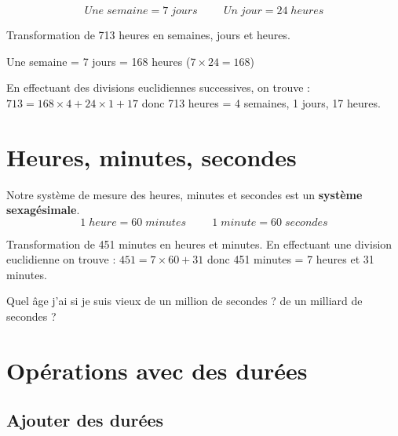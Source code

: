 \begin{pageCours}
\begin{Def}
\[Une \;semaine = 7 \;jours \hspace{1cm} Un\; jour = 24 \;heures\]
\end{Def}

\begin{Mt}
Transformation de 713 heures en semaines, jours et heures.

Une semaine = 7 jours = 168 heures ($7\times24=168$)

En effectuant des divisions euclidiennes successives, on trouve : $713=168\times4+24\times1+17$ donc 713 heures = 4 semaines, 1 jours, 17 heures.
\end{Mt}


\section{Heures, minutes, secondes}

\begin{Def}
Notre système de mesure des heures, minutes et secondes est un \textbf{système sexagésimale}.
\[1\;heure=60\;minutes\hspace{1cm}1\;minute=60\;secondes\]
\end{Def}

\begin{Mt}
Transformation de 451 minutes en heures et minutes.
En effectuant une division euclidienne on trouve :
$451=7\times60+31$ donc 451 minutes = 7 heures et 31 minutes.
\end{Mt}


\begin{autoeval}
Quel âge j'ai si je suis vieux de un million de secondes ? de un milliard de secondes ?
\end{autoeval}

\section{Opérations avec des durées}

\subsection{Ajouter des durées}


\end{pageCours}
